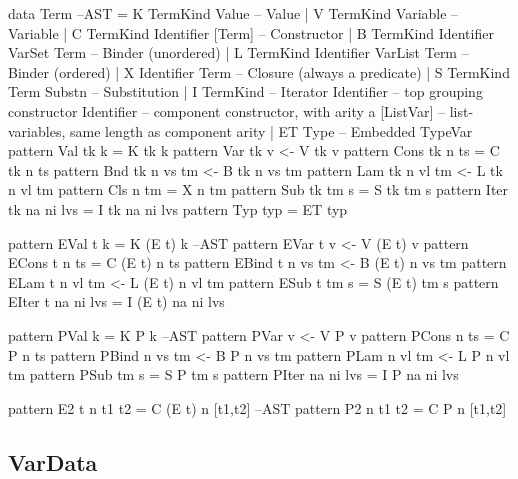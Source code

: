 \newpage
\begin{code}
data Term                                                                --AST
 = K TermKind Value                    -- Value
 | V TermKind Variable                 -- Variable
 | C TermKind Identifier [Term]        -- Constructor
 | B TermKind Identifier VarSet Term   -- Binder (unordered)
 | L TermKind Identifier VarList Term  -- Binder (ordered)
 | X Identifier Term                   -- Closure (always a predicate)
 | S TermKind Term Substn              -- Substitution
 | I TermKind                          -- Iterator
     Identifier  -- top grouping constructor
     Identifier  -- component constructor, with arity a
     [ListVar]   -- list-variables, same length as component arity
 | ET Type                              -- Embedded TypeVar
pattern Val  tk k          =   K tk k
pattern Var  tk v          <-  V tk v
pattern Cons tk n ts       =   C tk n ts
pattern Bnd  tk n vs tm    <-  B tk n vs tm
pattern Lam  tk n vl tm    <-  L tk n vl tm
pattern Cls     n    tm    =   X n tm
pattern Sub  tk tm s       =   S tk tm s
pattern Iter tk na ni lvs  =   I tk na ni lvs
pattern Typ  typ           =   ET typ
\end{code}


\begin{code}
pattern EVal t k           =  K (E t) k                                  --AST
pattern EVar t v          <-  V (E t) v
pattern ECons t n ts       =  C (E t) n ts
pattern EBind t n vs tm   <-  B (E t) n vs tm
pattern ELam t n vl tm    <-  L (E t) n vl tm
pattern ESub t tm s        =  S (E t) tm s
pattern EIter t na ni lvs  =  I (E t) na ni lvs
\end{code}

\begin{code}
pattern PVal k             =  K P k                                      --AST
pattern PVar v            <-  V P v
pattern PCons n ts         =  C P n ts
pattern PBind n vs tm     <-  B P n vs tm
pattern PLam n vl tm      <-  L P n vl tm
pattern PSub tm s          =  S P tm s
pattern PIter na ni lvs    =  I P na ni lvs
\end{code}

\begin{code}
pattern E2 t n t1 t2  = C (E t) n [t1,t2]                                --AST
pattern P2   n t1 t2  = C P     n [t1,t2]
\end{code}

\subsection{VarData}

